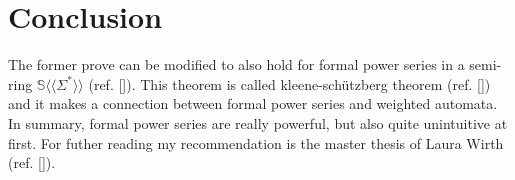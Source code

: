 \documentclass[12pt,letterpaper]{article}
\newcommand{\fps}[1] {
\mathbb{#1}\langle \langle \Sigma^* \rangle \rangle
}
\begin{document}
\section{Conclusion}
The former prove can be modified to also hold for formal power series in
a semi-ring $\fps{S}$ (ref. [\cite{Algebra}]). 
This theorem is called kleene-schützberg theorem (ref. [\cite{Algebra}]) and
it makes a connection between formal power series and weighted automata. 
In summary, formal power series are really powerful, but also quite
unintuitive at first. For futher reading my recommendation is the master thesis
of Laura Wirth (ref. [\cite{master}]).
\pagebreak
{}
\pagestyle{fancy}
 
 
\end{document}

